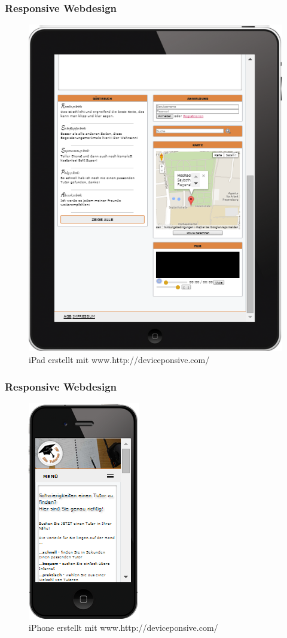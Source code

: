 \begin{frame}
  \frametitle{Responsive Webdesign}
\begin{figure}[!htbp]
 \centering
 \includegraphics[scale=.3]{./Source/Ipad2.PNG}
 \caption{iPad erstellt mit www.http://deviceponsive.com/}

\end{figure}
\end{frame}

\begin{frame}
  \frametitle{Responsive Webdesign}
\begin{figure}[!htbp]
 \centering
 \includegraphics[scale=0.5]{./Source/Iphone1.PNG}
 \caption{iPhone erstellt mit www.http://deviceponsive.com/}

\end{figure}
\end{frame}

